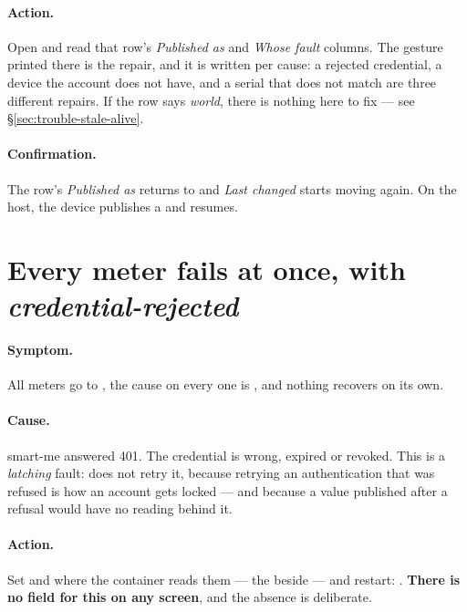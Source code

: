 \paragraph{Action.} Open  and read that row's \emph{Published as} and
\emph{Whose fault} columns. The gesture printed there is the repair, and it is written per
cause: a rejected credential, a device the account does not have, and a serial that does not
match are three different repairs. If the row says \emph{world}, there is nothing here to fix
--- see \S\ref{sec:trouble-stale-alive}.

\paragraph{Confirmation.} The row's \emph{Published as} returns to  and
\emph{Last changed} starts moving again. On the host, the device publishes a  and
resumes.

\section{Every meter fails at once, with \emph{credential-rejected}}
\label{sec:trouble-401}

\paragraph{Symptom.} All meters go to , the cause on every one is
, and nothing recovers on its own.

\paragraph{Cause.} smart-me answered 401. The credential is wrong, expired or revoked. This is
a \emph{latching} fault: \prog does not retry it, because retrying an authentication that was
refused is how an account gets locked --- and because a value published after a refusal would
have no reading behind it.

\paragraph{Action.} Set  and  where
the container reads them --- the  beside  --- and restart:
. \textbf{There is no field for this on any screen}, and the
absence is deliberate.

